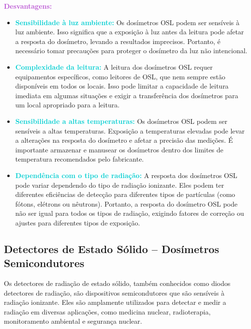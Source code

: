 \documentclass[11pt,a4paper]{article}
\begin{document}
\begin{tcolorbox}
	\textcolor{MediumOrchid}{\Large\LobsterTwo\textbf{Desvantagens:}}
	\begin{itemize}[label=\textcolor{CarnationPink}{$\blacktriangleright$}]
		\item \textcolor{DarkTurquoise}{\textbf{Sensibilidade à luz ambiente:}} Os dosímetros OSL podem ser sensíveis à luz ambiente. Isso significa que a exposição à luz antes da leitura pode afetar a resposta do dosímetro, levando a resultados imprecisos. Portanto, é necessário tomar precauções para proteger o dosímetro da luz não intencional.
		\item \textcolor{DarkTurquoise}{\textbf{Complexidade da leitura:}} A leitura dos dosímetros OSL requer equipamentos específicos, como leitores de OSL, que nem sempre estão disponíveis em todos os locais. Isso pode limitar a capacidade de leitura imediata em algumas situações e exigir a transferência dos dosímetros para um local apropriado para a leitura.
		\item \textcolor{DarkTurquoise}{\textbf{Sensibilidade a altas temperaturas:}} Os dosímetros OSL podem ser sensíveis a altas temperaturas. Exposição a temperaturas elevadas pode levar a alterações na resposta do dosímetro e afetar a precisão das medições. É importante armazenar e manusear os dosímetros dentro dos limites de temperatura recomendados pelo fabricante.
		\item \textcolor{DarkTurquoise}{\textbf{Dependência com o tipo de radiação:}} A resposta dos dosímetros OSL pode variar dependendo do tipo de radiação ionizante. Eles podem ter diferentes eficiências de detecção para diferentes tipos de partículas (como fótons, elétrons ou nêutrons). Portanto, a resposta do dosímetro OSL pode não ser igual para todos os tipos de radiação, exigindo fatores de correção ou ajustes para diferentes tipos de exposição.
	\end{itemize}
	\end{tcolorbox}

\subsection*{Detectores de Estado Sólido -- Dosímetros Semicondutores}

Os detectores de radiação de estado sólido, também conhecidos como diodos detectores de radiação, são dispositivos semicondutores que são sensíveis à radiação ionizante. Eles são amplamente utilizados para detectar e medir a radiação em diversas aplicações, como medicina nuclear, radioterapia, monitoramento ambiental e segurança nuclear.
\end{document}
